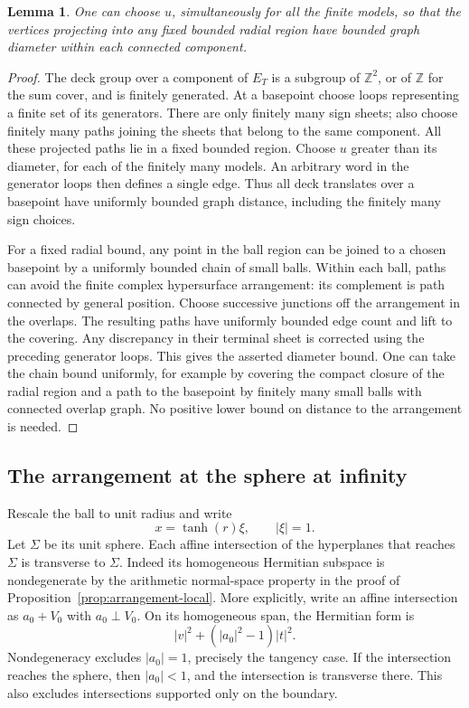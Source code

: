 \documentclass[11pt,reqno]{amsart}
\numberwithin{equation}{section}
\newtheorem{lemma}[theorem]{Lemma}
\theoremstyle{definition}
\theoremstyle{remark}
\begin{document}
\begin{lemma}\label{mod:bounded-core}
One can choose $u$, simultaneously for all the finite models, so
that the vertices projecting into any fixed bounded radial region
have bounded graph diameter within each connected component.
\end{lemma}
\begin{proof}
The deck group over a component of $E_T$ is a subgroup of $\mathbb Z^2$,
or of $\mathbb Z$ for the sum cover, and is finitely generated.  At a
basepoint choose loops representing a finite set of its generators.
There are only finitely many sign sheets; also choose finitely
many paths joining the sheets that belong to the same component.
All these projected paths lie in a fixed bounded region.  Choose
$u$ greater than its diameter, for each of the finitely many models.
An arbitrary word in the generator loops then defines a single
edge.  Thus all deck translates over a basepoint have uniformly
bounded graph distance, including the finitely many sign choices.

For a fixed radial bound, any point in the ball region can be
joined to a chosen basepoint by a uniformly bounded chain of small
balls.  Within each ball, paths can avoid the finite complex
hypersurface arrangement: its complement is path connected by
general position.  Choose successive junctions off the arrangement
in the overlaps.  The resulting paths have uniformly bounded
edge count and lift to the covering.  Any discrepancy in their
terminal sheet is corrected using the preceding generator loops.
This gives the asserted diameter bound.  One can take the chain
bound uniformly, for example by covering the compact closure of
the radial region and a path to the basepoint by finitely many
small balls with connected overlap graph.  No positive lower
bound on distance to the arrangement is needed.
\end{proof}

\subsection{The arrangement at the sphere at infinity}

Rescale the ball to unit radius and write
\[
 x=\tanh(r)\xi,\qquad |\xi|=1.
\]
Let $\Sigma$ be its unit sphere.  Each affine intersection of the
hyperplanes that reaches $\Sigma$ is transverse to $\Sigma$.
Indeed its homogeneous Hermitian subspace is nondegenerate by the
arithmetic normal-space property in the proof of
Proposition~\ref{prop:arrangement-local}.  More explicitly, write
an affine intersection as $a_0+V_0$ with $a_0\perp V_0$.  On its
homogeneous span, the Hermitian form is
\[
 |v|^2+(|a_0|^2-1)|t|^2.
\]
Nondegeneracy excludes $|a_0|=1$, precisely the tangency case.
If the intersection reaches the sphere, then $|a_0|<1$, and the
intersection is transverse there.  This also excludes intersections
supported only on the boundary.
\end{document}
